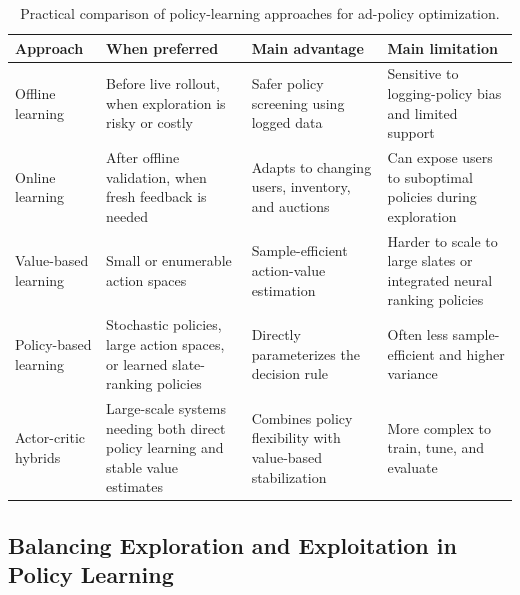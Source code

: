 \documentclass[manuscript,review,screen]{acmart}
\begin{document}
\begin{table}[ht]
\centering
\footnotesize
\renewcommand{\arraystretch}{1.15}
\setlength{\tabcolsep}{4pt}
\begin{tabularx}{\textwidth}{>{\raggedright\arraybackslash}p{} >{\raggedright\arraybackslash}X >{\raggedright\arraybackslash}X >{\raggedright\arraybackslash}X}
\toprule
\textbf{Approach} & \textbf{When preferred} & \textbf{Main advantage} & \textbf{Main limitation} \\
\midrule
Offline learning & Before live rollout, when exploration is risky or costly \cite{levine2020offline, gauci2018horizon, chen2022off} & Safer policy screening using logged data & Sensitive to logging-policy bias and limited support \cite{swaminathan2015counterfactual, dudik2011doubly} \\
Online learning & After offline validation, when fresh feedback is needed \cite{gauci2018horizon, Mehrotra2020} & Adapts to changing users, inventory, and auctions & Can expose users to suboptimal policies during exploration \cite{dulac2021challenges} \\
Value-based learning & Small or enumerable action spaces \cite{zhu2021overview, Theocharous-2015} & Sample-efficient action-value estimation & Harder to scale to large slates or integrated neural ranking policies \cite{ie2019slateq, dulac2021challenges} \\
Policy-based learning & Stochastic policies, large action spaces, or learned slate-ranking policies \cite{zhao2021dear, xu2023optimizing} & Directly parameterizes the decision rule & Often less sample-efficient and higher variance \cite{schulman2015trust, dulac2021challenges} \\
Actor-critic hybrids & Large-scale systems needing both direct policy learning and stable value estimates \cite{chen2022off, gauci2018horizon} & Combines policy flexibility with value-based stabilization & More complex to train, tune, and evaluate \cite{dulac2021challenges} \\
\bottomrule
\end{tabularx}
\caption{Practical comparison of policy-learning approaches for ad-policy optimization.}
\label{tab:policy-learning-comparison}
\end{table}


\subsection{Balancing Exploration and Exploitation in Policy Learning}
\label{subsec:exploration-exploitation}
\end{document}
